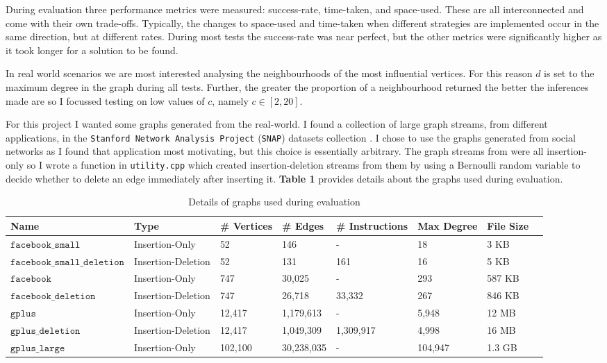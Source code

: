 \documentclass[11pt,twoside,a4paper]{report}
\begin{document}

During evaluation three performance metrics were measured: success-rate, time-taken, and space-used. These are all interconnected and come with their own trade-offs. Typically, the changes to space-used and time-taken when different strategies are implemented occur in the same direction, but at different rates. During most tests the success-rate was near perfect, but the other metrics were significantly higher as it took longer for a solution to be found.

\par In real world scenarios we are most interested analysing the neighbourhoods of the most influential vertices. For this reason $d$ is set to the maximum degree in the graph during all tests. Further, the greater the proportion of a neighbourhood returned the better the inferences made are so I focussed testing on low values of $c$, namely $c\in[2,20]$.

\par For this project I wanted some graphs generated from the real-world. I found a collection of large graph streams, from different applications, in the \texttt{Stanford Network Analysis Project} (\texttt{SNAP}) datasets collection \cite{SNAP}. I chose to use the graphs generated from social networks as I found that application most motivating, but this choice is essentially arbitrary. The graph streams from \cite{SNAP} were all insertion-only so I wrote a function in \texttt{utility.cpp} which created insertion-deletion streams from them by using a Bernoulli random variable to decide whether to delete an edge immediately after inserting it. \textbf{Table 1} provides details about the graphs used during evaluation.

\begin{center}
	\begin{table}[h]
		\tiny
		\begin{tabular}{|l|l|l|l|l|l|l|l|}
			\hline
			\textbf{Name}&\textbf{Type}&\textbf{\# Vertices}&\textbf{\# Edges}&\textbf{\# Instructions}&\textbf{Max Degree}&\textbf{File Size}\\
			\hline
			$\mathtt{facebook\_small}$&Insertion-Only&52&146&-&18&3 KB\\
			$\mathtt{facebook\_small\_deletion}$&Insertion-Deletion&52&131&161&16&5 KB\\
			$\mathtt{facebook}$&Insertion-Only&747&30,025&-&293&587 KB\\
			$\mathtt{facebook\_deletion}$&Insertion-Deletion&747&26,718&33,332&267&846 KB\\
			$\mathtt{gplus}$&Insertion-Only&12,417&1,179,613&-&5,948&12 MB\\
			$\mathtt{gplus\_deletion}$&Insertion-Deletion&12,417&1,049,309&1,309,917&4,998&16 MB\\
			$\mathtt{gplus\_large}$&Insertion-Only&102,100&30,238,035&-&104,947&1.3 GB\\
			\hline
		\end{tabular}
    \caption{Details of graphs used during evaluation}
	\end{table}
\end{center}
\end{document}
